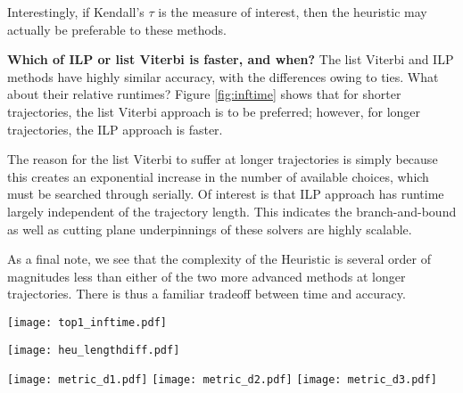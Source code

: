 Interestingly, if Kendall's $\tau$ is the measure of interest, then the heuristic may actually be preferable to these methods.

\textbf{Which of ILP or list Viterbi is faster, and when?}
The list Viterbi and ILP methods have highly similar accuracy, with the differences owing to ties.
What about their relative runtimes?
Figure \ref{fig:inftime} shows that for shorter trajectories, the list Viterbi approach is to be preferred;
however, for longer trajectories, the ILP approach is faster.

The reason for the list Viterbi to suffer at longer trajectories is simply because this creates an exponential increase in the number of available choices, which must be searched through serially.
Of interest is that ILP approach has runtime largely independent of the trajectory length.
This indicates the branch-and-bound as well as cutting plane underpinnings of these solvers are highly scalable.

As a final note, we see that the complexity of the Heuristic is several order of magnitudes less than either of the two more advanced methods at longer trajectories.
There is thus a familiar tradeoff between time and accuracy.



\begin{figure*}[!t]
		\centering
		\texttt{[image: top1\_inftime.pdf]}
	    \label{fig:inftime}
\end{figure*}
\begin{figure*}[!t]
		\centering
		\texttt{[image: heu\_lengthdiff.pdf]}
	    \label{fig:length-christo}
\end{figure*}

\begin{figure*}[!t]
		\centering
		\texttt{[image: metric\_d1.pdf]}
		\texttt{[image: metric\_d2.pdf]}
		\texttt{[image: metric\_d3.pdf]}
	    \label{fig:acc-vs-length}
\end{figure*}
